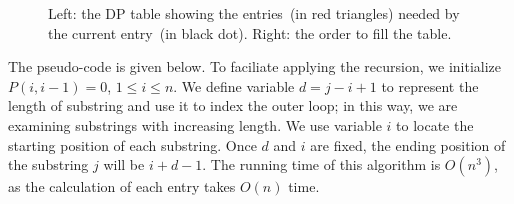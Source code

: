 \begin{figure}[h]
\centering{}
\caption{Left: the DP table showing the entries~(in red triangles) needed by the current entry~(in black dot).
Right: the order to fill the table.}
\label{fig:table}
\end{figure}

The pseudo-code is given below. 
To faciliate applying the recursion, we initialize $P(i, i - 1) = 0$, $1 \le i \le n$.
We define variable $d = j - i + 1$ to represent the length of substring and use it to index the outer loop; in this way,
we are examining substrings with increasing length.
We use variable $i$ to locate the starting position of each substring.
Once $d$ and $i$ are fixed, the ending position of the substring $j$ will be $i + d - 1$.
The running time of this algorithm is $O(n^3)$, as the calculation
of each entry takes $O(n)$ time.

\begin{minipage}{0.8\textwidth}
	\xxx
	\xxx
	\xxx
	\xxx
	\xxx
	\xxx
	\xxx
	\xxx
	\xxx
	\xxx
	\xxx
	\xxx
	\xxx
	\xxx
	\xxx
\end{minipage}


